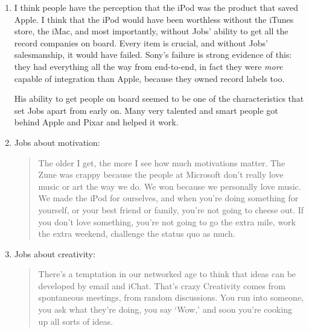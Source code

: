 \documentclass[11pt, oneside]{article}   	%
\begin{document}
\begin{enumerate}
\item I think people have the perception that the iPod was the product that saved Apple.  I think that the iPod would have been worthless without the iTunes store, the iMac, and most importantly, without Jobs' ability to get all the record companies on board.  Every item is crucial, and without Jobs' salesmanship, it would have failed.  Sony's failure is strong evidence of this: they had everything all the way from end-to-end, in fact they were \textit{more} capable of integration than Apple, because they owned record labels too.

His ability to get people on board seemed to be one of the characteristics that set Jobs apart from early on.  Many very talented and smart people got behind Apple and Pixar and helped it work.  

\item Jobs about motivation: \begin{quote} The older I get, the more I see how much motivations matter.  The Zune was crappy because the people at Microsoft don't really love music or art the way we do.  We won because we personally love music.  We made the iPod for ourselves, and when you're doing something for yourself, or your best friend or family, you're not going to cheese out.  If you don't love something, you're not going to go the extra mile, work the extra weekend, challenge the status quo as much.  \end{quote}    

\item Jobs about creativity: \begin{quote} There's a temptation in our networked age to think that ideas can be developed by email and iChat.  That's crazy Creativity comes from spontaneous meetings, from random discussions.  You run into someone, you ask what they're doing, you say `Wow,' and soon you're cooking up all sorts of ideas. \end{quote}    
\end{enumerate}
\end{document}

